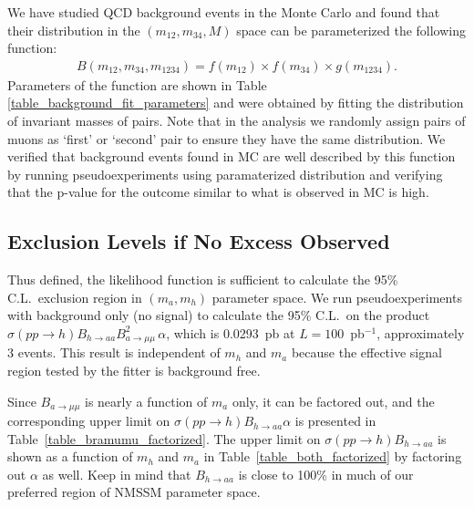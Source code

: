 \documentclass[aps,prd,onecolumn,superscriptaddress,showpacs]{revtex4}
\begin{document}
We have studied QCD background events in the Monte Carlo and found that their distribution in the $(m_{12}, m_{34}, M)$ space can be
parameterized the following function:
\begin{eqnarray}
B(m_{12}, m_{34}, m_{1234}) = f(m_12) \times f(m_34) \times g(m_{1234}). 
\end{eqnarray}
Parameters of the function are shown in Table \ref{table_background_fit_parameters} and were obtained by fitting
the distribution of invariant masses of pairs. Note that in the analysis we randomly assign pairs of muons as `first' 
or `second' pair to ensure they have the same distribution. We verified that background events found in MC are well 
described by this function by running pseudoexperiments using paramaterized distribution and verifying that the p-value
for the outcome similar to what is observed in MC is high.

\subsection{Exclusion Levels if No Excess Observed}

Thus defined, the likelihood function is sufficient to calculate the
95\% C.L.\ exclusion region in $(m_a, m_h)$ parameter space.  We run
pseudoexperiments with background only (no signal) to calculate the
95\% C.L.\ on the product $\sigma(pp \to h) B_{h \to aa} B^2_{a \to \mu \mu} \, \alpha$,
which is 0.0293~pb at $L = 100$~pb$^{-1}$,
approximately 3 events.  This result is independent of $m_h$ and $m_a$
because the effective signal region tested by the fitter is background
free.

Since $B_{a \to \mu\mu}$ is nearly a function of $m_a$ only, it can be
factored out, and the corresponding upper limit on $\sigma(pp \to h)
B_{h \to aa} \alpha$ is presented in
Table~\ref{table_bramumu_factorized}.  The upper limit on
$\sigma(pp \to h) B_{h \to aa}$ is shown as a function of $m_h$ and
$m_a$ in Table~\ref{table_both_factorized} by factoring out $\alpha$
as well.  Keep in mind that $B_{h \to aa}$ is close to 100\% in much
of our preferred region of NMSSM parameter space.
\end{document}
